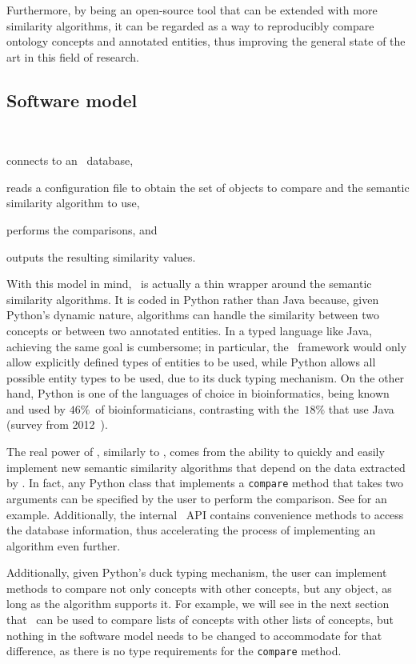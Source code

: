 Furthermore, by being an open-source tool that can be extended with more similarity algorithms, it can be regarded as a way to reproducibly compare ontology concepts and annotated entities, thus improving the general state of the art in this field of research.


\subsection{Software model} \label{sub:mossy/model}

\mossy\
\begin{paralist}
    \item connects to an \owlsql\ database,
    \item reads a configuration file to obtain the set of objects to compare and the semantic similarity algorithm to use,
    \item performs the comparisons, and
    \item outputs the resulting similarity values.
\end{paralist}
With this model in mind, \mossy\ is actually a thin wrapper around the semantic similarity algorithms. It is coded in Python rather than Java because, given Python's dynamic nature, algorithms can handle the similarity between two concepts or between two annotated entities. In a typed language like Java, achieving the same goal is cumbersome; in particular, the \mossy\ framework would only allow explicitly defined types of entities to be used, while Python allows all possible entity types to be used, due to its duck typing mechanism. On the other hand, Python is one of the languages of choice in bioinformatics, being known and used by $46\%$~of bioinformaticians, contrasting with the~$18\%$ that use Java (survey from 2012~\citep{Barton2012}).

The real power of \mossy, similarly to \owlsql, comes from the ability to quickly and easily implement new semantic similarity algorithms that depend on the data extracted by \owlsql. In fact, any Python class that implements a \texttt{compare} method that takes two arguments can be specified by the user to perform the comparison. See  for an example. Additionally, the internal \mossy\ API contains convenience methods to access the database information, thus accelerating the process of implementing an algorithm even further.

Additionally, given Python's duck typing mechanism, the user can implement methods to compare not only concepts with other concepts, but any object, as long as the algorithm supports it. For example, we will see in the next section that \mossy\ can be used to compare lists of concepts with other lists of concepts, but nothing in the software model needs to be changed to accommodate for that difference, as there is no type requirements for the \texttt{compare} method.

